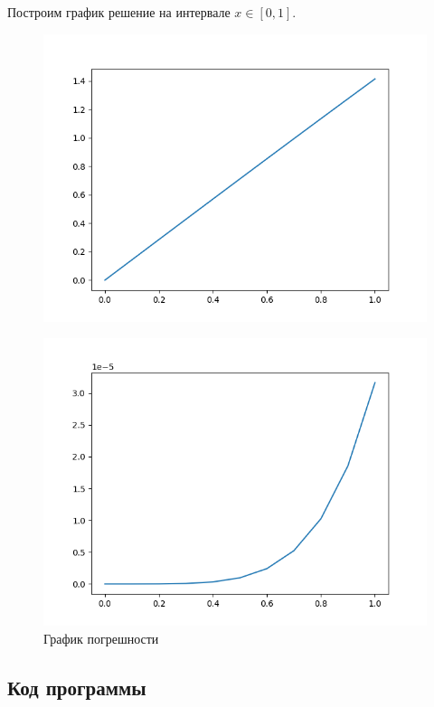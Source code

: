 \documentclass[a4paper, 14pt, fleqn]{extarticle}
\begin{document}
		 Построим график решение на интервале $x \in [0, 1]$.
		 
		\begin{figure}[h]
		 	\centering
		 	\includegraphics[width = 0.6\linewidth]{plot.png}
		\end{figure}
		\begin{figure}[h]
			\centering
			\includegraphics[width = 0.6\linewidth]{plot2.png}
			\caption{График погрешности}
		\end{figure}
		
		\pagebreak
		\pagebreak
		\subsection{Код программы}
			
\end{document}
